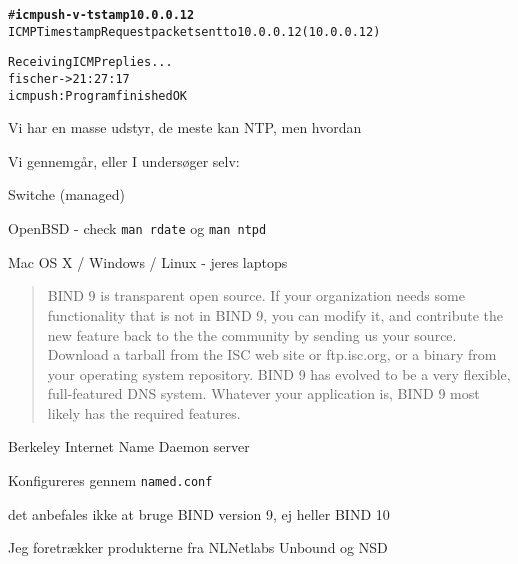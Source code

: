\documentclass[Screen16to9,17pt]{foils}
\begin{document}
\begin{alltt}
# {\bfseries icmpush -v -tstamp 10.0.0.12}
ICMP Timestamp Request packet sent to 10.0.0.12 (10.0.0.12)

Receiving ICMP replies ...
fischer         -> 21:27:17
icmpush: Program finished OK
\end{alltt}



\begin{list1}
\item Vi har en masse udstyr, de meste kan NTP, men hvordan
\item Vi gennemgår, eller I undersøger selv:
\begin{list2}
\item Switche (managed)
\item OpenBSD - check \verb+man rdate+ og \verb+man ntpd+
\item Mac OS X / Windows / Linux - jeres laptops
\end{list2}
\end{list1}






\begin{quote}
BIND 9 is transparent open source. If your organization needs some functionality that is not in BIND 9, you can modify it, and contribute the new feature back to the the community by sending us your source. Download a tarball from the ISC web site or ftp.isc.org, or a binary from your operating system repository.
BIND 9 has evolved to be a very flexible, full-featured DNS system. Whatever your application is, BIND 9 most likely has the required features.\\
\end{quote}

\begin{list1}
\item Berkeley Internet Name Daemon server
\item Konfigureres gennem \verb+named.conf+
\item det anbefales ikke at bruge BIND version 9, ej heller BIND 10
\item Jeg foretrækker produkterne fra NLNetlabs Unbound og NSD
\end{list1}

\end{document}
